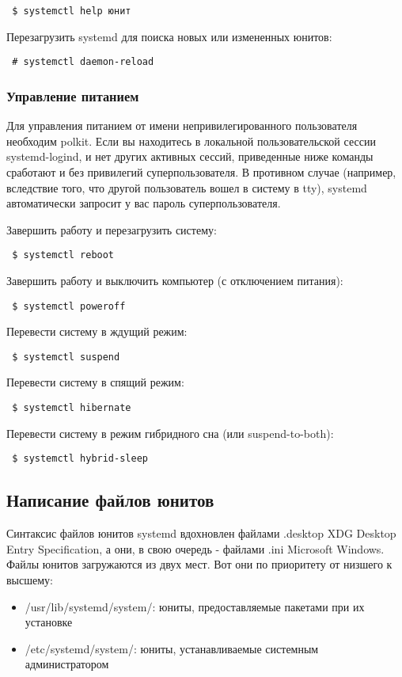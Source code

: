 \documentclass[a4paper,10pt,twoside]{article}
\begin{document}
\begin{verbatim}
 $ systemctl help юнит
\end{verbatim} 

Перезагрузить systemd для поиска новых или измененных юнитов:

\begin{verbatim}
 # systemctl daemon-reload
\end{verbatim} 


\subsubsection{Управление питанием}
Для управления питанием от имени непривилегированного пользователя необходим polkit. Если вы находитесь в локальной пользовательской сессии systemd-logind, и нет других активных сессий, приведенные ниже команды сработают и без привилегий суперпользователя. В противном случае (например, вследствие того, что другой пользователь вошел в систему в tty), systemd автоматически запросит у вас пароль суперпользователя.

Завершить работу и перезагрузить систему:
\begin{verbatim}
 $ systemctl reboot
\end{verbatim} 

Завершить работу и выключить компьютер (с отключением питания):

\begin{verbatim}
 $ systemctl poweroff
\end{verbatim} 
Перевести систему в ждущий режим:

\begin{verbatim}
 $ systemctl suspend
\end{verbatim} 
Перевести систему в спящий режим:

\begin{verbatim}
 $ systemctl hibernate
\end{verbatim} 
Перевести систему в режим гибридного сна (или suspend-to-both):

\begin{verbatim}
 $ systemctl hybrid-sleep
\end{verbatim} 

\subsection{Написание файлов юнитов}
Синтаксис файлов юнитов systemd вдохновлен файлами .desktop XDG Desktop Entry Specification, а они, в свою очередь - файлами .ini Microsoft Windows. Файлы юнитов загружаются из двух мест. Вот они по приоритету от низшего к высшему:
\begin{itemize}
 \item /usr/lib/systemd/system/: юниты, предоставляемые пакетами при их установке
 \item /etc/systemd/system/: юниты, устанавливаемые системным администратором
 \end{itemize}
 
\end{document}
